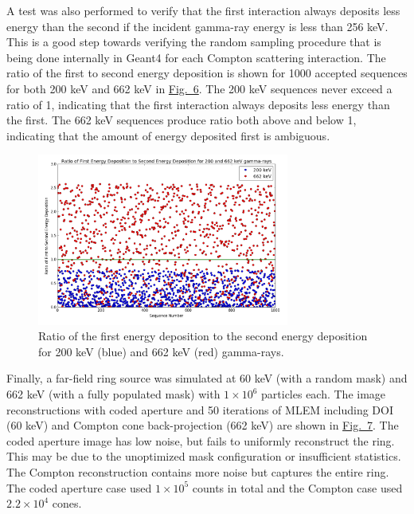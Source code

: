 \documentclass[10pt]{article}
\begin{document}
A test was also performed to verify that the first interaction always deposits less energy than the second if the incident gamma-ray energy is less than 256 keV. This is a good step towards verifying the random sampling procedure that is being done internally in Geant4 for each Compton scattering interaction. The ratio of the first to second energy deposition is shown for 1000 accepted sequences for both 200 keV and 662 keV in \hyperlink{fig6}{Fig.~6}. The 200 keV sequences never exceed a ratio of 1, indicating that the first interaction always deposits less energy than the first. The 662 keV sequences produce ratio both above and below 1, indicating that the amount of energy deposited first is ambiguous.

\begin{figure}[htb!]
\hypertarget{fig6}{}
\centering
\includegraphics[height=160pt]{Figures/EnergyDepTest.png} 
\caption{Ratio of the first energy deposition to the second energy deposition for 200 keV (blue) and 662 keV (red) gamma-rays.}
\end{figure}

Finally, a far-field ring source was simulated at 60 keV (with a random mask) and 662 keV (with a fully populated mask) with $1\times10^6$ particles each. The image reconstructions with coded aperture and 50 iterations of MLEM including DOI (60 keV) and Compton cone back-projection (662 keV) are shown in \hyperlink{fig7}{Fig.~7}. The coded aperture image has low noise, but fails to uniformly reconstruct the ring. This may be due to the unoptimized mask configuration or insufficient statistics. The Compton reconstruction contains more noise but captures the entire ring. The coded aperture case used $1\times10^5$ counts in total and the Compton case used $2.2\times10^4$ cones.
\end{document}
